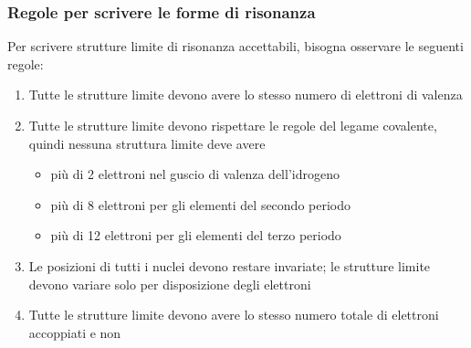 \subsubsection{Regole per scrivere le forme di risonanza}
\noindent Per scrivere strutture limite di risonanza accettabili, bisogna osservare le seguenti regole:
\begin{enumerate}
	\item Tutte le strutture limite devono avere lo stesso numero di elettroni di valenza
	\item Tutte le strutture limite devono rispettare le regole del legame covalente, quindi nessuna struttura limite deve avere
	      \begin{itemize}
		      \item più di 2 elettroni nel guscio di valenza dell'idrogeno
		      \item più di 8 elettroni per gli elementi del secondo periodo
		      \item più di 12 elettroni per gli elementi del terzo periodo
	      \end{itemize}
	\item Le posizioni di tutti i nuclei devono restare invariate; le strutture limite devono variare solo per disposizione degli elettroni
	\item Tutte le strutture limite devono avere lo stesso numero totale di elettroni accoppiati e non
\end{enumerate}